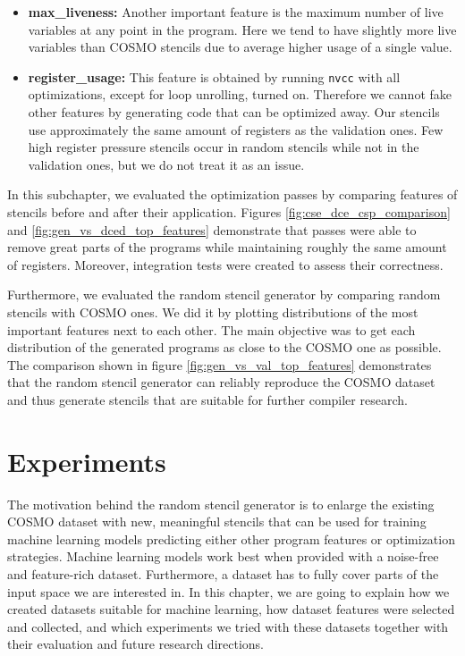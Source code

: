\documentclass[sigplan,\review anonymous]{acmart}
\begin{document}
\begin{itemize}
  \item \textbf{max\_liveness:} Another important feature is the maximum number
  of live variables at any point in the program. Here we tend to have slightly
  more live variables than COSMO stencils due to average higher usage of a
  single value.

  \item \textbf{register\_usage:} This feature is obtained by running
  \texttt{nvcc} with all optimizations, except for loop unrolling, turned on.
  Therefore we cannot fake other features by generating code that can be
  optimized away. Our stencils use approximately the same amount of registers
  as the validation ones. Few high register pressure stencils occur in random
  stencils while not in the validation ones, but we do not treat it as an issue.
\end{itemize}

In this subchapter, we evaluated the optimization passes by comparing features
of stencils before and after their application. Figures
\ref{fig:cse_dce_csp_comparison} and \ref{fig:gen_vs_dced_top_features}
demonstrate that passes were able to remove great parts of the programs while
maintaining roughly the same amount of registers. Moreover, integration tests
were created to assess their correctness.

Furthermore, we evaluated the random stencil generator by comparing random
stencils with COSMO ones. We did it by plotting distributions of the most
important features next to each other. The main objective was to get each
distribution of the generated programs as close to the COSMO one as possible.
The comparison shown in figure \ref{fig:gen_vs_val_top_features} demonstrates
that the random stencil generator can reliably reproduce the COSMO dataset
and thus generate stencils that are suitable for further compiler research.


\section{Experiments \label{sec:Chapter4}}

The motivation behind the random stencil generator is to enlarge the existing
COSMO dataset with new, meaningful stencils that can be used for training
machine learning models predicting either other program features or
optimization strategies. Machine learning models work best when provided with
a noise-free and feature-rich dataset. Furthermore, a dataset has to fully
cover parts of the input space we are interested in. In this chapter, we are
going to explain how we created datasets suitable for machine learning, how
dataset features were selected and collected, and which experiments we tried
with these datasets together with their evaluation and future research
directions.
\end{document}
